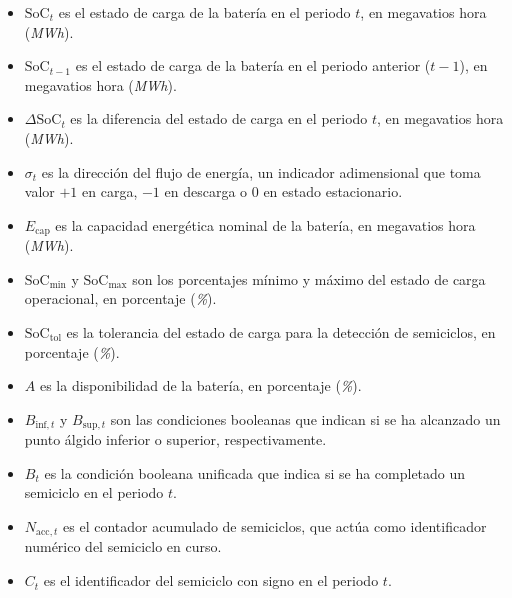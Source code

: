 \begin{itemize}

\item \( \mathrm{SoC}_{t} \) es el estado de carga de la batería en el periodo \( t \), en megavatios hora (\textit{MWh}).

\item \( \mathrm{SoC}_{t-1} \) es el estado de carga de la batería en el periodo anterior (\( t-1 \)), en megavatios hora (\textit{MWh}).

\item \( \Delta \mathrm{SoC}_{t} \) es la diferencia del estado de carga en el periodo \( t \), en megavatios hora (\textit{MWh}).

\item \( \sigma_{t} \) es la dirección del flujo de energía, un indicador adimensional que toma valor \(+1\) en carga, \(-1\) en descarga o \(0\) en estado estacionario.

\item \( E_{\text{cap}} \) es la capacidad energética nominal de la batería, en megavatios hora (\textit{MWh}).

\item \( \mathrm{SoC}_{\text{min}} \) y \( \mathrm{SoC}_{\text{max}} \) son los porcentajes mínimo y máximo del estado de carga operacional, en porcentaje (\textit{\%}).

\item \( \mathrm{SoC}_{\text{tol}} \) es la tolerancia del estado de carga para la detección de semiciclos, en porcentaje (\textit{\%}).

\item \( A \) es la disponibilidad de la batería, en porcentaje (\textit{\%}).

\item \( B_{\text{inf}, t} \) y \( B_{\text{sup}, t} \) son las condiciones booleanas que indican si se ha alcanzado un punto álgido inferior o superior, respectivamente.

\item \( B_{t} \) es la condición booleana unificada que indica si se ha completado un semiciclo en el periodo \( t \).

\item \( N_{\text{acc}, t} \) es el contador acumulado de semiciclos, que actúa como identificador numérico del semiciclo en curso.

\item \( C_{t} \) es el identificador del semiciclo con signo en el periodo \( t \).


\end{itemize}
